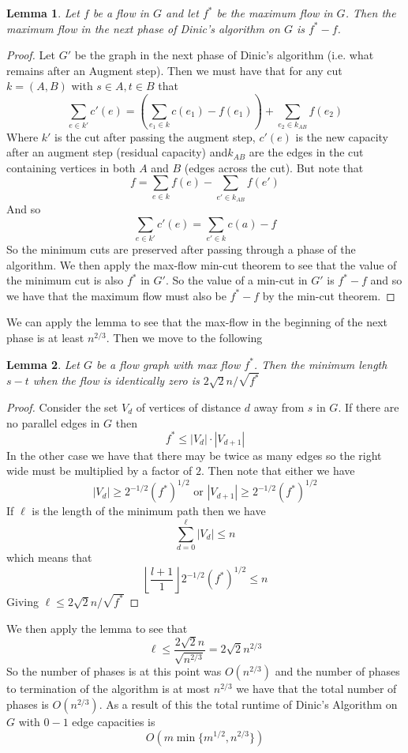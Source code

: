 \documentclass{article}
\newtheorem*{lem}{Lemma}
\begin{document}
\begin{lem}
Let $f$ be a flow in $G$ and let $f^*$ be the maximum flow in $G$. Then the maximum flow in the next phase of Dinic's algorithm on $G$ is $f^* - f$. 
\end{lem}
\begin{proof}
Let $G'$ be the graph in the next phase of Dinic's algorithm (i.e. what remains after an Augment step). Then we must have that for any cut $k = (A,B)$ with $s\in A, t\in B$ that
\[
\sum_{e\in k'} c'(e) = \left(\sum_{e_1 \in k} c(e_1) - f(e_1)\right) + \sum_{e_2 \in k_{AB}} f(e_2) 
\]
Where $k'$ is the cut after passing the augment step, $c'(e)$ is the new capacity after an augment step (residual capacity) and$k_{AB}$ are the edges in the cut containing vertices in both $A$ and $B$ (edges across the cut). But note that
\[
f = \sum_{e \in k} f(e) - \sum_{e' \in k_{AB}} f(e')
\] 
And so
\[
\sum_{e \in k'} c'(e) = \sum_{e' \in k} c(a) - f
\]
So the minimum cuts are preserved after passing through a phase of the algorithm. We then apply the max-flow min-cut theorem to see that the value of the minimum cut is also $f^*$ in $G'$. So the value of a min-cut in $G'$ is $f^* - f$ and so we have that the maximum flow must also be $f^* - f$ by the min-cut theorem.
\end{proof}

We can apply the lemma to see that the max-flow in the beginning of the next phase is at least $n^{2/3}$. Then we move to the following \\
\begin{lem}
Let $G$ be a flow graph with max flow $f^*$. Then the minimum length $s-t$ when the flow is identically zero is $2\sqrt{2}n/\sqrt{f^*}$
\end{lem}
\begin{proof}
Consider the set $V_d$ of vertices of distance $d$ away from $s$ in $G$. If there are no parallel edges in $G$ then 
\[
f^* \leq |V_d|\cdot|V_{d+1}| 
\]
In the other case we have that there may be twice as many edges so the right wide must be multiplied by a factor of $2$. Then note that either we have
\[
|V_d| \geq 2^{-1/2}(f^*)^{1/2} \text{ or } |V_{d+1}| \geq 2^{-1/2}(f^*)^{1/2}
\]
If $\ell$ is the length of the minimum path then we have 
\[
\sum_{d=0}^{\ell} |V_d| \leq n
\]
which means that
\[
\left\lfloor \frac{l+1}{1}\right\rfloor 2^{-1/2}(f^*)^{1/2} \leq n
\]
Giving $\ell \leq 2\sqrt{2}n/\sqrt{f^*}$
\end{proof}
We then apply the lemma to see that 
\[
\ell \leq \frac{2\sqrt{2}n}{\sqrt{n^{2/3}}} = 2\sqrt{2}n^{2/3}
\]
So the number of phases is at this point was $O(n^{2/3})$ and the number of phases to termination of the algorithm is at most $n^{2/3}$ we have that the total number of phases is $O(n^{2/3})$. As a result of this the total runtime of Dinic's Algorithm on $G$ with $0-1$ edge capacities is
\[
O(m\min\{m^{1/2}, n^{2/3}\})
\]
\end{document}
